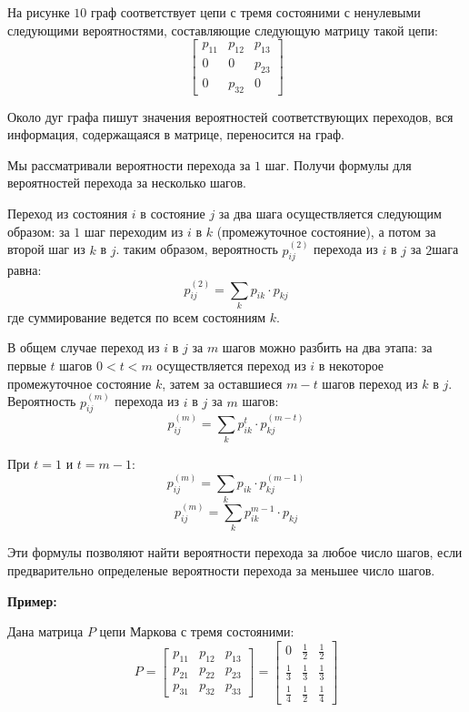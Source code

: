 \documentclass[aps,%
12pt,%
final,%
oneside,
onecolumn,%
musixtex, %
superscriptaddress,%
centertags]{article} %
\theoremstyle{plain}
\theoremstyle{definition}
\theoremstyle{remark}
\begin{document}
На рисунке $10$ граф соответствует цепи с тремя состояними с ненулевыми следующими вероятностями, составляющие следующую матрицу такой цепи:
$$\begin{bmatrix}
	p_{11} & p_{12} & p_{13} \\
	0 & 0 & p_{23} \\
	0 & p_{32} & 0
\end{bmatrix}$$

Около дуг графа пишут значения вероятностей соответствующих переходов, вся информация, содержащаяся в матрице, переносится на граф.

Мы рассматривали вероятности перехода за $1$ шаг. Получи формулы для вероятностей перехода за несколько шагов.

Переход из состояния $i$ в состояние $j$ за два шага осуществляется следующим образом: за $1$ шаг переходим из $i$ в $k$ (промежуточное состояние), а потом за второй шаг из $k$ в $j$. таким образом, вероятность $p_{ij}^{(2)}$ перехода из $i$ в $j$ за $2$шага равна:
$$p_{ij}^{(2)} = \sum\limits_{k}p_{ik}\cdot p_{kj}$$
где суммирование ведется по всем состояниям $k$.

В общем случае переход из $i$ в $j$ за $m$ шагов можно разбить на два этапа: за первые $t$ шагов $0 < t < m$ осуществляется переход из $i$ в некоторое промежуточное состояние $k$, затем за оставшиеся $m-t$ шагов переход из $k$ в $j$. Вероятность $p_{ij}^{(m)}$ перехода из $i$ в $j$ за $m$ шагов:
$$p_{ij}^{(m)} = \sum\limits_{k}p_{ik}^{t} \cdot p_{kj}^{(m-t)}$$

При $t=1$ и $t=m-1$:
$$p_{ij}^{(m)} = \sum\limits_{k}p_{ik} \cdot p_{kj}^{(m-1)}$$
$$p_{ij}^{(m)} = \sum\limits_{k}p_{ik}^{m-1} \cdot p_{kj}$$

Эти формулы позволяют найти вероятности перехода за любое число шагов, если предварительно определеные вероятности перехода за меньшее число шагов.

\textbf{Пример:}

Дана матрица $P$ цепи Маркова с тремя состояними:
$$P = \begin{bmatrix}
	p_{11} & p_{12} & p_{13} \\
	p_{21} & p_{22} & p_{23} \\
	p_{31} & p_{32} & p_{33}
\end{bmatrix} = \begin{bmatrix}
	0 & \frac{1}{2} & \frac{1}{2} \\
	\frac{1}{3} & \frac{1}{3} & \frac{1}{3} \\
	\frac{1}{4} & \frac{1}{2} & \frac{1}{4}
\end{bmatrix}$$
\end{document}
